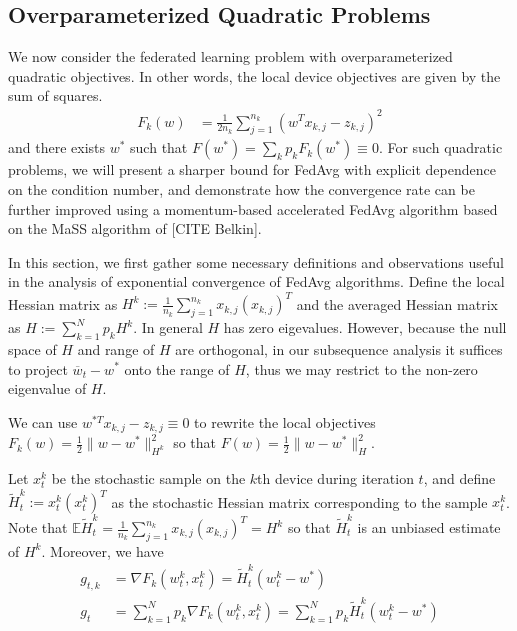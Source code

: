 \subsection{Overparameterized Quadratic Problems}

We now consider the federated learning problem with overparameterized
quadratic objectives. In other words, the local device objectives
are given by the sum of squares. 
\begin{align*}
F_{k}(w) & =\frac{1}{2n_{k}}\sum_{j=1}^{n_{k}}(w^{T}x_{k,j}-z_{k,j})^{2}
\end{align*}
and there exists $w^{\ast}$ such that $F(w^{\ast})=\sum_{k}p_{k}F_{k}(w^{\ast})\equiv0$.
For such quadratic problems, we will present a sharper bound for FedAvg
with explicit dependence on the condition number, and demonstrate
how the convergence rate can be further improved using a momentum-based
accelerated FedAvg algorithm based on the MaSS algorithm of {[}CITE
Belkin{]}. 

In this section, we first gather some necessary definitions and observations
useful in the analysis of exponential convergence of FedAvg algorithms.
Define the local Hessian matrix as $H^{k}:=\frac{1}{n_{k}}\sum_{j=1}^{n_{k}}x_{k,j}(x_{k,j})^{T}$
and the averaged Hessian matrix as $H:=\sum_{k=1}^{N}p_{k}H^{k}$.
In general $H$ has zero eigevalues. However, because the null space
of $H$ and range of $H$ are orthogonal, in our subsequence analysis
it suffices to project $\overline{w}_{t}-w^{\ast}$ onto the range
of $H$, thus we may restrict to the non-zero eigenvalue of $H$. 

We can use $w^{\ast T}x_{k,j}-z_{k,j}\equiv0$ to rewrite the local
objectives $F_{k}(w)=\frac{1}{2}\|w-w^{\ast}\|_{H^{k}}^{2}$ so that
$F(w)=\frac{1}{2}\|w-w^{\ast}\|_{H}^{2}$. %
\begin{comment}
\begin{align*}
F_{k}(w) & =\frac{1}{2n_{k}}\sum_{j=1}^{n_{k}}(w^{T}x_{k,j}-z_{k,j}-(w^{\ast T}x_{k,j}-z_{k,j}))^{2}=\frac{1}{2n_{k}}\sum_{j=1}^{n_{k}}((w-w^{\ast})^{T}x_{k,j})^{2}\\
& =\frac{1}{2}\langle w-w^{\ast},H^{k}(w-w^{\ast})\rangle=\frac{1}{2}\|w-w^{\ast}\|_{H^{k}}^{2}
\end{align*}
\end{comment}

Let $x_{t}^{k}$ be the stochastic sample on the $k$th device during
iteration $t$, and define $\tilde{H}_{t}^{k}:=x_{t}^{k}(x_{t}^{k})^{T}$
as the stochastic Hessian matrix corresponding to the sample $x_{t}^{k}$.
Note that $\mathbb{E}\tilde{H}_{t}^{k}=\frac{1}{n_{k}}\sum_{j=1}^{n_{k}}x_{k,j}(x_{k,j})^{T}=H^{k}$
so that $\tilde{H}_{t}^{k}$ is an unbiased estimate of $H^{k}$.
Moreover, we have
\begin{align*}
g_{t,k} & =\nabla F_{k}(w_{t}^{k},x_{t}^{k})=\tilde{H}_{t}^{k}(w_{t}^{k}-w^{\ast})\\
g_{t} & =\sum_{k=1}^{N}p_{k}\nabla F_{k}(w_{t}^{k},x_{t}^{k})=\sum_{k=1}^{N}p_{k}\tilde{H}_{t}^{k}(w_{t}^{k}-w^{\ast})
\end{align*}

